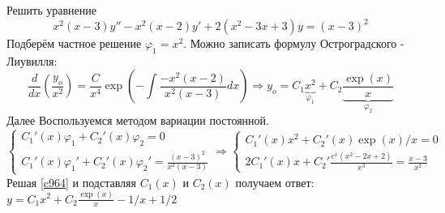 \documentclass{article}
\begin{document}
Решить уравнение 
\begin{equation}
    x^2(x-3)y'' - x^2 (x-2)y' + 2(x^2-3x +3)y = (x-3)^2
\end{equation}
Подберём частное решение $\varphi_1 = x^2$. Можно записать формулу Остроградского - Лиувилля:
\begin{equation}
    \frac{d}{dx} \left( \frac{y_o}{x^2} \right) = \frac{C}{x^4} \exp \left( -\int  \frac{- x^2 (x-2)}{x^2(x-3)} dx\right) 
    \Rightarrow
    y_o = C_1 \underbrace{x^2}_{\varphi_1} + C_2\underbrace{\frac{\exp(x)}{x}}_{\varphi_2}        
\end{equation}
    Далее Воспользуемся методом вариации постоянной.
    \begin{equation} \label{c964}
        \begin{cases}
            C_1'(x) \varphi_1 + C_2'(x) \varphi_2 = 0 \\
            C_1'(x) \varphi_1' + C_2'(x) \varphi_2' = \frac{(x-3)^2}{x^2 (x-3)}
        \end{cases}
        \Rightarrow
        \begin{cases}
            C_1'(x) x^2 + C_2'(x) \exp(x)/x = 0 \\
            2 C_1'(x) x + C_2' \frac{e^x(x^2-2x+2)}{x^3} = \frac{x-3}{x^2}
        \end{cases}
    \end{equation}
    Решая \ref{c964} и подставляя $C_1(x)$ и $C_2(x)$ получаем ответ: $y=C_1 x^2 + C_2 \frac{\exp(x)}{x}-1/x+1/2$
\end{document}
